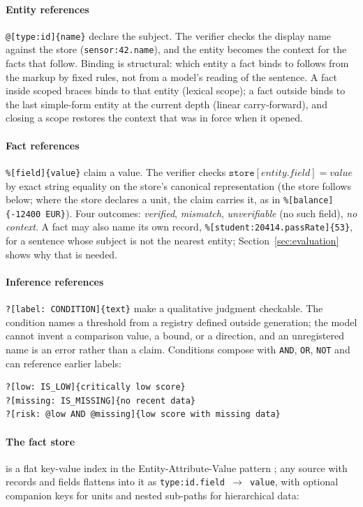 \documentclass[11pt,a4paper]{article}
\begin{document}
\paragraph{Entity references} \texttt{@[type:id]\{name\}} declare the subject. The verifier checks the display name against the store (\texttt{sensor:42.name}), and the entity becomes the context for the facts that follow. Binding is structural: which entity a fact binds to follows from the markup by fixed rules, not from a model's reading of the sentence. A fact inside scoped braces binds to that entity (lexical scope); a fact outside binds to the last simple-form entity at the current depth (linear carry-forward), and closing a scope restores the context that was in force when it opened.

\paragraph{Fact references} \texttt{\%[field]\{value\}} claim a value. The verifier checks $\texttt{store}[\textit{entity}.\textit{field}] = \textit{value}$ by exact string equality on the store's canonical representation (the store follows below; where the store declares a unit, the claim carries it, as in \texttt{\%[balance]\{-12400 EUR\}}). Four outcomes: \textit{verified}, \textit{mismatch}, \textit{unverifiable} (no such field), \textit{no context}. A fact may also name its own record, \texttt{\%[student:20414.passRate]\{53\}}, for a sentence whose subject is not the nearest entity; Section~\ref{sec:evaluation} shows why that is needed.

\paragraph{Inference references} \texttt{?[label: CONDITION]\{text\}} make a qualitative judgment checkable. The condition names a threshold from a registry defined outside generation; the model cannot invent a comparison value, a bound, or a direction, and an unregistered name is an error rather than a claim. Conditions compose with \texttt{AND}, \texttt{OR}, \texttt{NOT} and can reference earlier labels:

\begin{lstlisting}
?[low: IS_LOW]{critically low score}
?[missing: IS_MISSING]{no recent data}
?[risk: @low AND @missing]{low score with missing data}
\end{lstlisting}

\paragraph{The fact store} is a flat key-value index in the Entity-Attribute-Value pattern \citep{nadkarni1999,dinu2007}; any source with records and fields flattens into it as \texttt{type:id.field $\rightarrow$ value}, with optional companion keys for units and nested sub-paths for hierarchical data:
\end{document}
